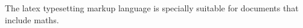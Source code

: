 \documentclass{report}
\begin{document}
	The \Gls{latex} typesetting markup language is specially suitable for documents that include \gls{maths}. 
	\clearpage
	\printglossary
\end{document}
